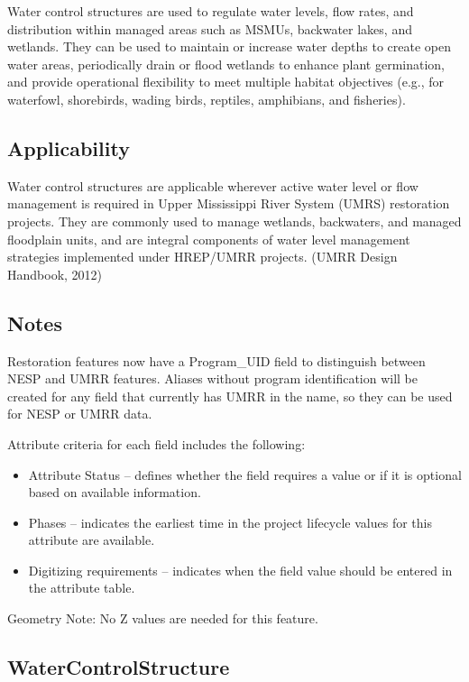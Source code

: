 \documentclass[
  letterpaper,
  DIV=11,
  numbers=noendperiod]{scrreprt}
\providecommand{\tightlist}{%
  \setlength{\itemsep}{0pt}\setlength{\parskip}{0pt}}
\begin{document}
Water control structures are used to regulate water levels, flow rates,
and distribution within managed areas such as MSMUs, backwater lakes,
and wetlands. They can be used to maintain or increase water depths to
create open water areas, periodically drain or flood wetlands to enhance
plant germination, and provide operational flexibility to meet multiple
habitat objectives (e.g., for waterfowl, shorebirds, wading birds,
reptiles, amphibians, and fisheries).

\subsection{Applicability}\label{applicability-14}

Water control structures are applicable wherever active water level or
flow management is required in Upper Mississippi River System (UMRS)
restoration projects. They are commonly used to manage wetlands,
backwaters, and managed floodplain units, and are integral components of
water level management strategies implemented under HREP/UMRR projects.
(UMRR Design Handbook, 2012)

\subsection{Notes}\label{notes-16}

Restoration features now have a Program\_UID field to distinguish
between NESP and UMRR features. Aliases without program identification
will be created for any field that currently has UMRR in the name, so
they can be used for NESP or UMRR data.

Attribute criteria for each field includes the following:

\begin{itemize}
\tightlist
\item
  Attribute Status -- defines whether the field requires a value or if
  it is optional based on available information.
\item
  Phases -- indicates the earliest time in the project lifecycle values
  for this attribute are available.
\item
  Digitizing requirements -- indicates when the field value should be
  entered in the attribute table.
\end{itemize}

Geometry Note: No Z values are needed for this feature.

\subsection{WaterControlStructure}\label{watercontrolstructure}
\end{document}
